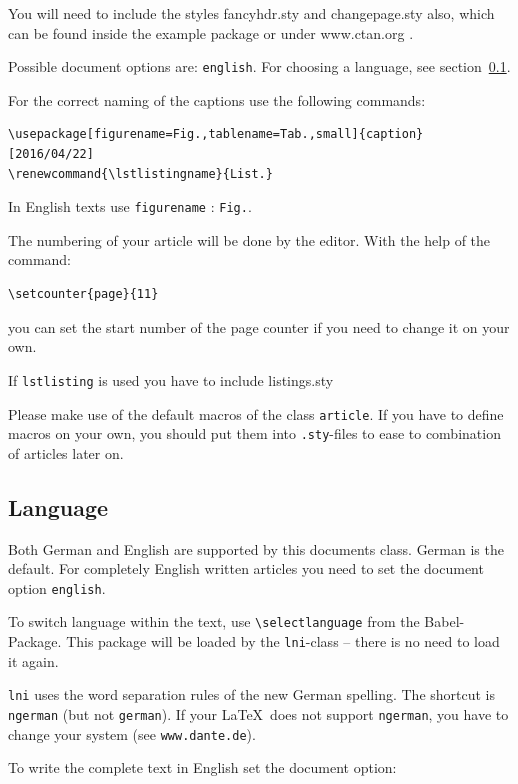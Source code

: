 \documentclass[english]{lni}
\renewcommand{\lstlistingname}{List.}    %
\begin{document}
You will need to include the styles fancyhdr.sty and changepage.sty also, which can be found inside the example package or under www.ctan.org .

Possible document options are: \texttt{english}. For choosing a language, see section~\ref{sprache}.\linebreak
\clearpage


For the correct naming of the captions use the following commands:

\begin{verbatim}
\usepackage[figurename=Fig.,tablename=Tab.,small]{caption}
[2016/04/22]
\renewcommand{\lstlistingname}{List.}  
\end{verbatim}
In English texts use \texttt{figurename} : \texttt{Fig.}.

The numbering of your article will be done by the editor. With the help of the command:
\begin{verbatim}
\setcounter{page}{11}
\end{verbatim}

you can set the start number of the page counter if you need to change it on your own.

If \texttt{lstlisting} is used you have to include listings.sty

Please make use of the default macros of the class \texttt{article}. If you have to define macros on your own, you should put them into \texttt{.sty}-files to ease to combination of articles later on.

\subsection{Language}
\label{sprache}

Both German and English are supported by this documents class. German is the default. For completely English written articles you need to set the document option \texttt{english}.

To switch language within the text, use \verb|\selectlanguage| from the Babel-Package. This package will be loaded by the \texttt{lni}-class -- there is no need to load it again.

\texttt{lni} uses the word separation rules of the new German spelling. The shortcut is \texttt{ngerman} (but not \texttt{german}). If your \LaTeX\ does not support \texttt{ngerman}, you have to change your system (see \texttt{www.dante.de}).

To write the complete text in English set the document option:
\end{document}
